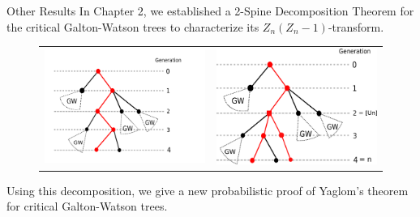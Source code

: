 \documentclass[xcolor=dvipsnames]{beamer}
\begin{document}
\begin{frame}{Other Results}
In Chapter 2, we established a {\color{red} 2-Spine Decomposition Theorem} for the {\color{red} critical Galton-Watson trees} to characterize its $Z_n(Z_n - 1)$-transform.
\begin{figure}[h]
  \begin{tabular}{ll}
    \includegraphics[scale=0.35]{1-spine.png}
    &
      \includegraphics[scale=0.35]{2-spine.png}
  \end{tabular}
\end{figure}
Using this decomposition, we give a new probabilistic proof of Yaglom's theorem for critical Galton-Watson trees.
\end{frame}
\end{document}
